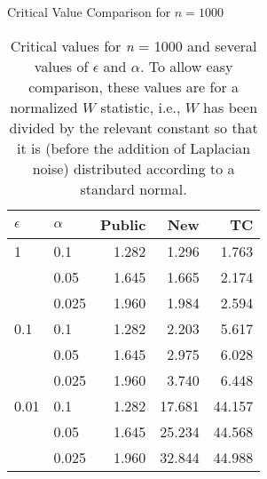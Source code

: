 \begin{table}[ht]
\centering
\caption{Critical Value Comparison for $n=1000$}\label{tab:n_1000_comp}
\begin{tabular}{llrrr}
  \hline
$\epsilon$ & $\alpha$ & Public & New & TC \\ 
  \hline
1 & 0.1 & 1.282 & 1.296 & 1.763 \\ 
   & 0.05 & 1.645 & 1.665 & 2.174 \\ 
   & 0.025 & 1.960 & 1.984 & 2.594 \\ 
   \hline
0.1 & 0.1 & 1.282 & 2.203 & 5.617 \\ 
   & 0.05 & 1.645 & 2.975 & 6.028 \\ 
   & 0.025 & 1.960 & 3.740 & 6.448 \\ 
   \hline
0.01 & 0.1 & 1.282 & 17.681 & 44.157 \\ 
   & 0.05 & 1.645 & 25.234 & 44.568 \\ 
   & 0.025 & 1.960 & 32.844 & 44.988 \\ 
   \hline
\end{tabular}
\\[10pt]
\caption*{Critical values for \textit{n} = 1000 and several values of $\epsilon$ and $\alpha$.  To allow easy comparison, these values are for a normalized $W$ statistic, i.e., $W$ has been divided by the relevant constant so that it is (before the addition of Laplacian noise) distributed according to a standard normal.}
\end{table}
